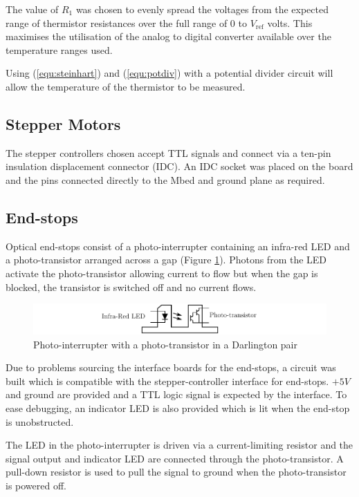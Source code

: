 			The value of $R_1$ was chosen to evenly spread the voltages from the
			expected range of thermistor resistances over the full range of 0 to
			$V_\textrm{ref}$ volts. This maximises the utilisation of the analog to
			digital converter available over the temperature ranges used.
			
			Using (\ref{equ:steinhart}) and (\ref{equ:potdiv}) with a potential
			divider circuit will allow the temperature of the thermistor to be
			measured.
			
		
		\subsection{Stepper Motors}
			
			The stepper controllers chosen accept TTL signals and connect via a
			ten-pin insulation displacement connector (IDC). An IDC socket was
			placed on the board and the pins connected directly to the Mbed and
			ground plane as required.
		
		\subsection{End-stops}
			
			Optical end-stops consist of a photo-interrupter containing an infra-red
			LED and a photo-transistor arranged across a gap (Figure
			\ref{fig:endstop}). Photons from the LED activate the photo-transistor
			allowing current to flow but when the gap is blocked, the transistor is
			switched off and no current flows.
			
			\begin{figure}
				\includegraphics[width=1\textwidth]{diagrams/endstop.pdf}
				\caption{Photo-interrupter with a photo-transistor in a Darlington pair}
				\label{fig:endstop}
			\end{figure}
			
			Due to problems sourcing the interface boards for the end-stops, a
			circuit was built which is compatible with the stepper-controller
			interface for end-stops. $+5V$ and ground are provided and a TTL logic
			signal is expected by the interface. To ease debugging, an indicator LED
			is also provided which is lit when the end-stop is unobstructed.
			
			The LED in the photo-interrupter is driven via a current-limiting
			resistor and the signal output and indicator LED are connected through
			the photo-transistor. A pull-down resistor is used to pull the signal
			to ground when the photo-transistor is powered off.
			
